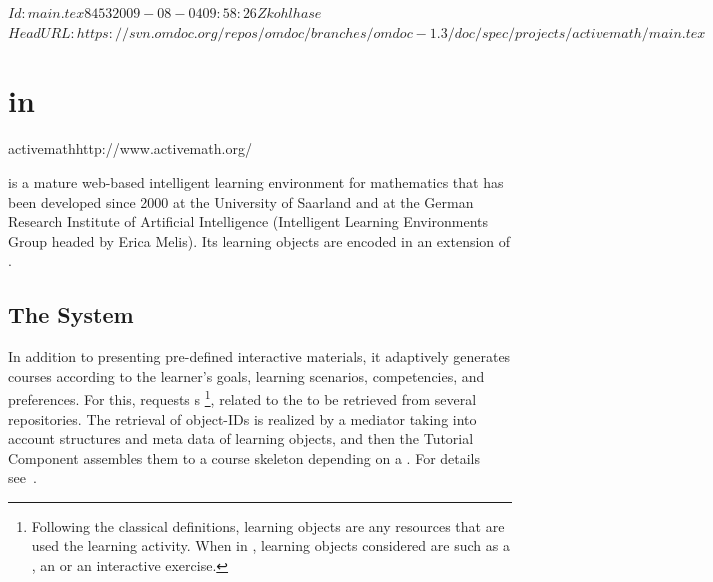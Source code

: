 \svnInfo $Id: main.tex 8453 2009-08-04 09:58:26Z kohlhase $
\svnKeyword $HeadURL: https://svn.omdoc.org/repos/omdoc/branches/omdoc-1.3/doc/spec/projects/activemath/main.tex $

\section[ActiveMath]{{\omdoc} in {\activemath}}
\begin{project}{activemath}{http://www.activemath.org/}
\end{project}


{\activemath} is a mature web-based intelligent learning environment for mathematics that
has been developed since 2000 at the University of Saarland and at the German Research
Institute of Artificial Intelligence (Intelligent Learning Environments Group headed by
Erica Melis). Its learning objects are encoded in an extension of {\omdoc}.

\subsection{The {\activemath} System}

In addition to presenting pre-defined interactive materials, it adaptively generates
courses according to the learner's goals, learning scenarios, competencies, and
preferences. For this, {} requests
{s} \footnote{Following the classical definitions, learning
  objects are any resources that are used the learning activity. When in {\omdoc},
  learning objects considered are such as a , an  or
  an interactive exercise.}, related to the {} to be retrieved
from several repositories.  The retrieval of object-IDs is realized by a mediator taking
into account structures and meta data of learning objects, and then the Tutorial Component
assembles them to a course skeleton depending on a {}.  For
details
see~\cite{Ullrich-TutorialPlanningYRT-AIED-2005,Ullrich-InstructionalOntology-ISWC-2004}.

